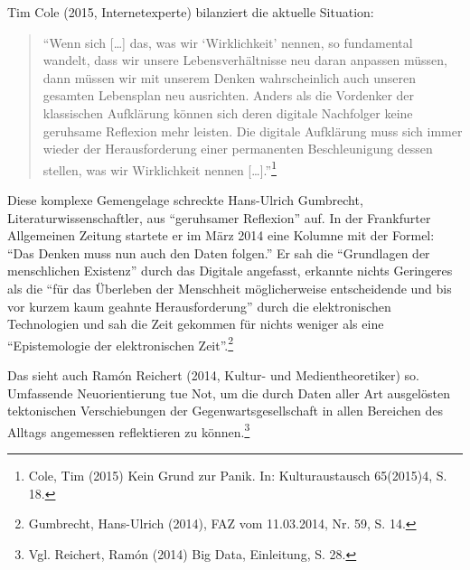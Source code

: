 \documentclass[a4paper,
fontsize=11pt,
oneside,
numbers=noperiodatend,
parskip=half-,
bibliography=totoc,
final
]{scrartcl}
\begin{document}
Tim Cole (2015, Internetexperte) bilanziert die aktuelle Situation:

\begin{quote}
\enquote{Wenn sich {[}\ldots{}{]} das, was wir \enquote{Wirklichkeit}
nennen, so fundamental wandelt, dass wir unsere Lebensverhältnisse neu
daran anpassen müssen, dann müssen wir mit unserem Denken wahrscheinlich
auch unseren gesamten Lebensplan neu ausrichten. Anders als die
Vordenker der klassischen Aufklärung können sich deren digitale
Nachfolger keine geruhsame Reflexion mehr leisten. Die digitale
Aufklärung muss sich immer wieder der Herausforderung einer permanenten
Beschleunigung dessen stellen, was wir Wirklichkeit nennen
{[}\ldots{}{]}.}\footnote{Cole, Tim (2015) Kein Grund zur Panik. In:
  Kulturaustausch 65(2015)4, S. 18.}
\end{quote}

Diese komplexe Gemengelage schreckte Hans-Ulrich Gumbrecht,
Literaturwissenschaftler, aus \enquote{geruhsamer Reflexion} auf. In der
Frankfurter Allgemeinen Zeitung startete er im März 2014 eine Kolumne
mit der Formel: \enquote{Das Denken muss nun auch den Daten folgen.} Er
sah die \enquote{Grundlagen der menschlichen Existenz} durch das
Digitale angefasst, erkannte nichts Geringeres als die \enquote{für das
Überleben der Menschheit möglicherweise entscheidende und bis vor kurzem
kaum geahnte Herausforderung} durch die elektronischen Technologien und
sah die Zeit gekommen für nichts weniger als eine \enquote{Epistemologie
der elektronischen Zeit}.\footnote{Gumbrecht, Hans-Ulrich (2014), FAZ
  vom 11.03.2014, Nr. 59, S. 14.}

Das sieht auch Ramón Reichert (2014, Kultur- und Medientheoretiker) so.
Umfassende Neuorientierung tue Not, um die durch Daten aller Art
ausgelösten tektonischen Verschiebungen der Gegenwartsgesellschaft in
allen Bereichen des Alltags angemessen reflektieren zu können.\footnote{Vgl.
  Reichert, Ramón (2014) Big Data, Einleitung, S. 28.}
\end{document}

